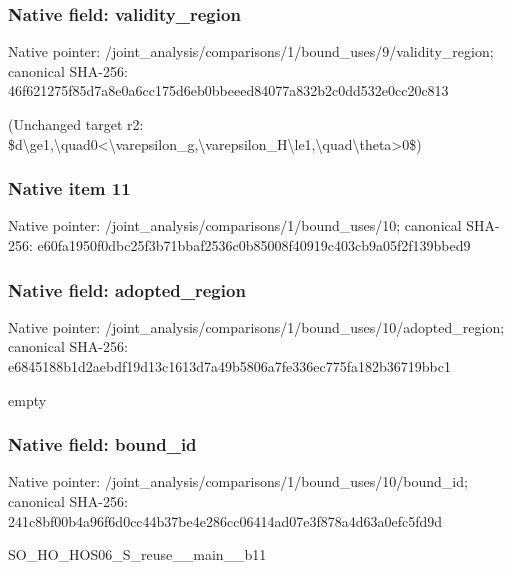 \documentclass[10pt,a4paper]{article}
\begin{document}
\subsubsection{Native field: validity\_\allowbreak{}region}
Native pointer: /joint\_\allowbreak{}analysis/comparisons/1/bound\_\allowbreak{}uses/9/validity\_\allowbreak{}region; canonical SHA-256: 46f621275f85d7a8e0a6cc175d6eb0bbeeed84077a832b2c0dd532e0cc20c813

\begingroup\raggedright\sloppy (Unchanged target r2:\allowbreak{} \$d\textbackslash{}ge1,\allowbreak{}\textbackslash{}quad0<\textbackslash{}varepsilon\_\allowbreak{}g,\allowbreak{}\textbackslash{}varepsilon\_\allowbreak{}H\textbackslash{}le1,\allowbreak{}\textbackslash{}quad\textbackslash{}theta>0\$)\par\endgroup

\subsubsection{Native item 11}
Native pointer: /joint\_\allowbreak{}analysis/comparisons/1/bound\_\allowbreak{}uses/10; canonical SHA-256: e60fa1950f0dbc25f3b71bbaf2536c0b85008f40919c403cb9a05f2f139bbed9

\subsubsection{Native field: adopted\_\allowbreak{}region}
Native pointer: /joint\_\allowbreak{}analysis/comparisons/1/bound\_\allowbreak{}uses/10/adopted\_\allowbreak{}region; canonical SHA-256: e6845188b1d2aebdf19d13c1613d7a49b5806a7fe336ec775fa182b36719bbc1

\begingroup\raggedright\sloppy empty\par\endgroup

\subsubsection{Native field: bound\_\allowbreak{}id}
Native pointer: /joint\_\allowbreak{}analysis/comparisons/1/bound\_\allowbreak{}uses/10/bound\_\allowbreak{}id; canonical SHA-256: 241c8bf00b4a96f6d0cc44b37be4e286cc06414ad07e3f878a4d63a0efc5fd9d

\begingroup\raggedright\sloppy SO\_\allowbreak{}HO\_\allowbreak{}HOS06\_\allowbreak{}S\_\allowbreak{}reuse\_\allowbreak{}\_\allowbreak{}main\_\allowbreak{}\_\allowbreak{}b11\par\endgroup
\end{document}
